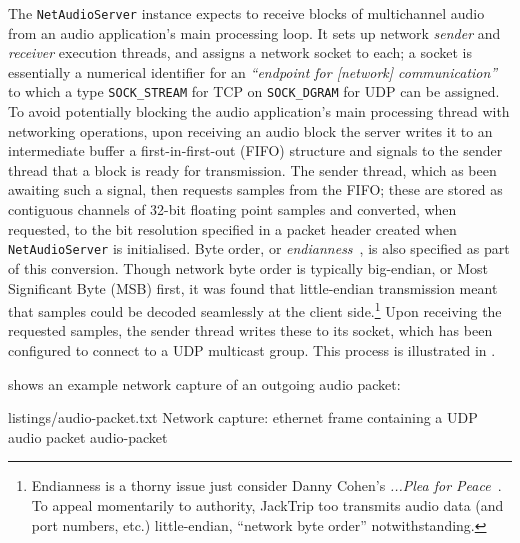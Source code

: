The \texttt{NetAudioServer} instance expects to receive blocks of
multichannel audio from an audio application's main processing loop.
It sets up network \textit{sender} and \textit{receiver} execution threads, and
assigns a network socket to each; a socket is essentially a numerical identifier
for an
\textit{``endpoint for [network] communication''}~\citep{kerrisk_socket2_2023}
to which a type \textemdash{} \texttt{SOCK\_STREAM} for TCP on
\texttt{SOCK\_DGRAM} for UDP \textemdash{} can be assigned.
To avoid potentially blocking the audio application's main processing thread
with networking operations, upon receiving an audio block the server writes it
to an intermediate buffer \textemdash{} a first-in-first-out (FIFO) structure
\textemdash{} and signals to the sender thread that a block is ready for
transmission.
The sender thread, which as been awaiting such a signal, then requests samples
from the FIFO; these are stored as contiguous channels of 32-bit floating point
samples and converted, when requested, to the bit resolution specified in a
packet header created when \texttt{NetAudioServer} is initialised.
Byte order, or \textit{endianness}~\citep{cohen_holy_1981}, is also specified as
part of this conversion.
Though network byte order is typically big-endian, or Most Significant Byte
(MSB) first, it was found that little-endian transmission meant that samples
could be decoded seamlessly at the client side.\footnote{
    Endianness is a thorny issue \textemdash{} just consider Danny Cohen's
    \textit{...Plea for Peace}~\citep{cohen_holy_1981}.
    To appeal momentarily to authority, JackTrip too transmits audio data (and
    port numbers, etc.) little-endian, ``network byte order'' notwithstanding.
}
Upon receiving the requested samples, the sender thread writes these to its
socket, which has been configured to connect to a UDP multicast group.
This process is illustrated in .

 shows an example network capture of an outgoing
audio packet:

{listings/audio-packet.txt}
{Network capture: ethernet frame containing a UDP audio packet}
{audio-packet}

